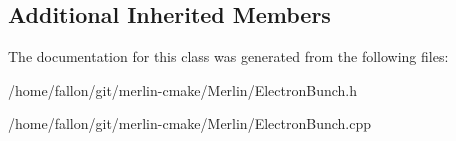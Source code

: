 \subsection*{Additional Inherited Members}


The documentation for this class was generated from the following files\+:\begin{DoxyCompactItemize}
\item 
/home/fallon/git/merlin-\/cmake/\+Merlin/Electron\+Bunch.\+h\item 
/home/fallon/git/merlin-\/cmake/\+Merlin/Electron\+Bunch.\+cpp\end{DoxyCompactItemize}
